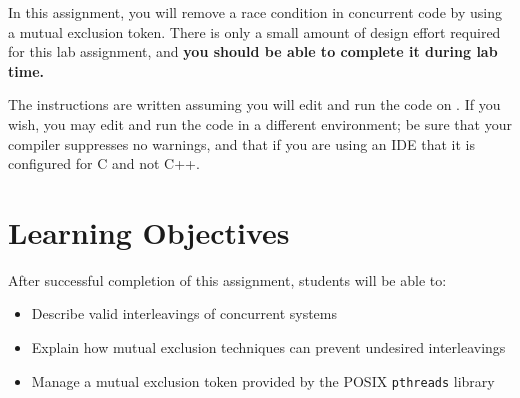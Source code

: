 




\renewcommand{\labnumber}{\duplicatorlabnumber}
\renewcommand{\labname}{Race Condition Elimination Lab}
\renewcommand{\shortlabname}{duplicatorlab}
\renewcommand{\collaborationrules}{\duplicatorlabcollaboration}
\renewcommand{\duedate}{\duplicatorlabdue}

\pagelayout

    \labidentifier

    In this assignment, you will remove a race condition in concurrent code by using a mutual exclusion token.
    There is only a small amount of design effort required for this lab assignment, and \textbf{you should be able to complete it during lab time.}

    The instructions are written assuming you will edit and run the code on \runtimeenvironment.
    If you wish, you may edit and run the code in a different environment;
    be sure that your compiler suppresses no warnings, and that if you are using an IDE that it is configured for C and not C++.

    \section*{Learning Objectives}

    After successful completion of this assignment, students will be able to:
    \begin{itemize}
        \item Describe valid interleavings of concurrent systems
        \item Explain how mutual exclusion techniques can prevent undesired interleavings
        \item Manage a mutual exclusion token provided by the POSIX \texttt{pthreads} library
    \end{itemize}

